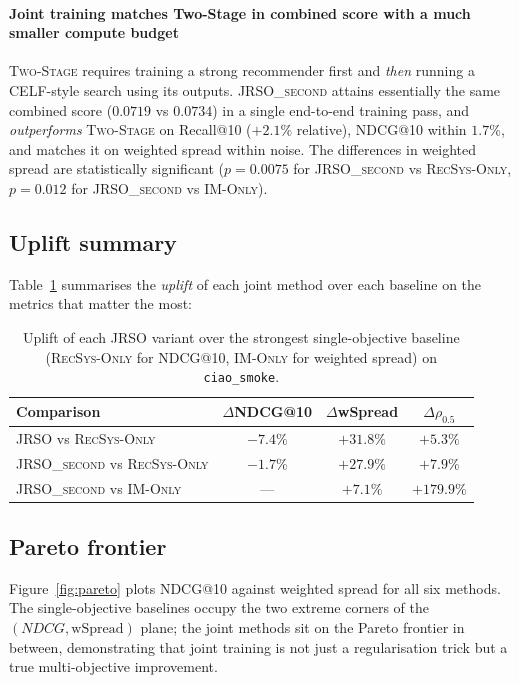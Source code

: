 \documentclass[conference]{IEEEtran}
\begin{document}
\paragraph{Joint training matches Two-Stage in combined score with a
much smaller compute budget}
\textsc{Two-Stage} requires training a strong recommender first and
\emph{then} running a CELF-style search using its outputs.
\textsc{JRSO\_second} attains essentially the same combined score
($0.0719$ vs $0.0734$) in a single end-to-end training pass, and
\emph{outperforms} \textsc{Two-Stage} on Recall@10
($+2.1\%$ relative), NDCG@10 within $1.7\%$, and matches it on
weighted spread within noise. The differences in weighted spread are
statistically significant
($p\!=\!0.0075$ for \textsc{JRSO\_second} vs \textsc{RecSys-Only},
$p\!=\!0.012$ for \textsc{JRSO\_second} vs \textsc{IM-Only}).

\subsection{Uplift summary}

Table~\ref{tab:uplift} summarises the \emph{uplift} of each joint method
over each baseline on the metrics that matter the most:

\begin{table}[t]
\centering
\caption{Uplift of each JRSO variant over the strongest single-objective
baseline (\textsc{RecSys-Only} for NDCG@10, \textsc{IM-Only} for
weighted spread) on \texttt{ciao\_smoke}.}
\label{tab:uplift}
\begin{tabular}{lccc}
\toprule
\textbf{Comparison} & $\Delta$NDCG@10 & $\Delta$wSpread & $\Delta\rho_{0.5}$ \\
\midrule
\textsc{JRSO}        vs \textsc{RecSys-Only} & $-7.4\%$ & $+31.8\%$ & $+5.3\%$ \\
\textsc{JRSO\_second} vs \textsc{RecSys-Only} & $-1.7\%$ & $+27.9\%$ & $+7.9\%$ \\
\textsc{JRSO\_second} vs \textsc{IM-Only}     & --- & $+7.1\%$  & $+179.9\%$ \\
\bottomrule
\end{tabular}
\end{table}

\subsection{Pareto frontier}
Figure~\ref{fig:pareto} plots NDCG@10 against weighted spread for all
six methods. The single-objective baselines occupy the two extreme
corners of the $(NDCG,\mathrm{wSpread})$ plane; the joint methods sit
on the Pareto frontier in between, demonstrating that joint training is
not just a regularisation trick but a true multi-objective improvement.
\end{document}
